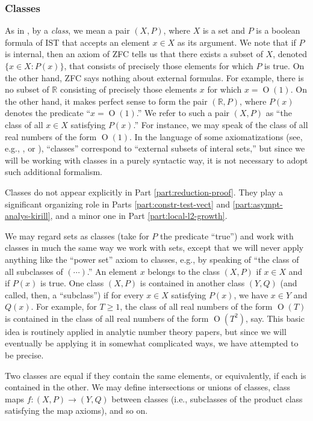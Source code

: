 \documentclass[reqno]{amsart}
\def\O{\operatorname{O}}
\theoremstyle{plain} \newtheorem{theorem} {Theorem}
\theoremstyle{definition} \newtheorem{definition} [theorem] {Definition}
\theoremstyle{itplain} %
\numberwithin{equation}{section}
\numberwithin{theorem}{section}
\renewcommand{\geq}{\geqslant}
\begin{document}
\subsubsection{Classes}\label{sec:classes}
As in \cite[\S3.1.4]{2020arXiv201202187N}, by a \emph{class}, we mean a pair $(X,P)$, where $X$ is a set and $P$ is a boolean formula of IST that accepts an element $x \in X$ as its argument.  We note that if $P$ is internal, then an axiom of ZFC tells us that there exists a subset of $X$, denoted $\{x \in X : P(x)\}$, that consists of precisely those elements for which $P$ is true.  On the other hand, ZFC says nothing about external formulas.  For example, there is no subset of $\mathbb{R}$ consisting of precisely those elements $x$ for which $x = \O(1)$.  On the other hand, it makes perfect sense to form the pair $(\mathbb{R},P)$, where $P(x)$ denotes the predicate ``$x = \O(1)$.''  We refer to such a pair $(X,P)$ as ``the class of all $x \in X$ satisfying $P(x)$.''  For instance, we may speak of the class of all real numbers of the form $\O(1)$.  In the language of some axiomatizations (see, e.g., \cite[\S3]{MR469763}, \cite{MR723332} or \cite[\S3]{MR546178}), ``classes'' correspond to ``external subsets of interal sets,'' but since we will be working with classes in a purely syntactic way, it is not necessary to adopt such additional formalism.

Classes do not appear explicitly in Part \ref{part:reduction-proof}.  They play a significant organizing role in Parts \ref{part:constr-test-vect} and \ref{part:asympt-analys-kirill}, and a minor one in Part \ref{part:local-l2-growth}.

We may regard sets as classes (take for $P$ the predicate ``true'') and work with classes in much the same way we work with sets, except that we will never apply anything like the ``power set'' axiom to classes, e.g., by speaking of ``the class of all subclasses of $(\dotsb)$.''  An element $x$ belongs to the class $(X,P)$ if $x \in X$ and if $P(x)$ is true.  One class $(X,P)$ is contained in another class $(Y,Q)$ (and called, then, a ``subclass'') if for every $x \in X$ satisfying $P(x)$, we have $x \in Y$ and $Q(x)$.  For example, for $T \geq 1$, the class of all real numbers of the form $\O(T)$ is contained in the class of all real numbers of the form $\O(T^2)$, say.  This basic idea is routinely applied in analytic number theory papers, but since we will eventually be applying it in somewhat complicated ways, we have attempted to be precise.

Two classes are equal if they contain the same elements, or equivalently, if each is contained in the other.  We may define intersections or unions of classes, class maps $f : (X,P) \rightarrow (Y,Q)$ between classes (i.e., subclasses of the product class satisfying the map axioms), and so on.
\end{document}
